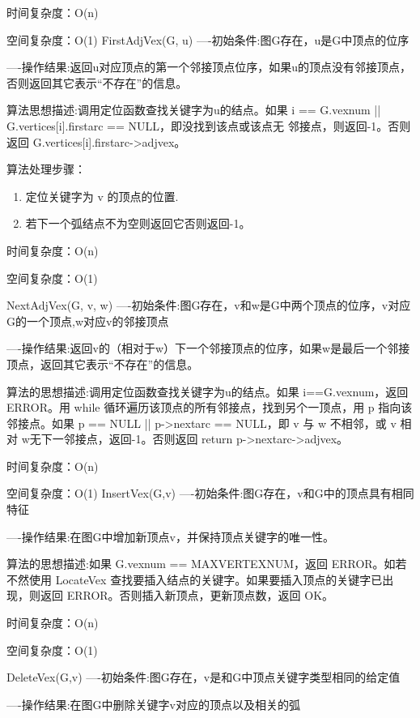 \documentclass[supercite]{Experimental_Report}
\theoremstyle{definition}
\begin{document}
时间复杂度：O(n)

空间复杂度：O(1)
FirstAdjVex(G, u)
----初始条件:图G存在，u是G中顶点的位序

----操作结果:返回u对应顶点的第一个邻接顶点位序，如果u的顶点没有邻接顶点，否则返回其它表示“不存在”的信息。

算法思想描述:调用定位函数查找关键字为u的结点。如果 i == G.vexnum || G.vertices[i].firstarc == NULL，即没找到该点或该点无
邻接点，则返回-1。否则返回 G.vertices[i].firstarc->adjvex。

算法处理步骤：
\begin{enumerate}
	\renewcommand{\labelenumi}{\theenumi)}
	\item 定位关键字为 v 的顶点的位置.
	\item 若下一个弧结点不为空则返回它否则返回-1。
\end{enumerate}

时间复杂度：O(n)

空间复杂度：O(1)

NextAdjVex(G, v, w)
----初始条件:图G存在，v和w是G中两个顶点的位序，v对应G的一个顶点,w对应v的邻接顶点

----操作结果:返回v的（相对于w）下一个邻接顶点的位序，如果w是最后一个邻接顶点，返回其它表示“不存在”的信息。

算法的思想描述:调用定位函数查找关键字为u的结点。如果 i==G.vexnum，返回ERROR。用 while 循环遍历该顶点的所有邻接点，找到另个一顶点，用 p 指向该邻接点。如果 p == NULL || p->nextarc == NULL，即 v 与 w 不相邻，或 v 相对 w无下一邻接点，返回-1。否则返回 return p->nextarc->adjvex。

时间复杂度：O(n)

空间复杂度：O(1)
InsertVex(G,v)
----初始条件:图G存在，v和G中的顶点具有相同特征

----操作结果:在图G中增加新顶点v，并保持顶点关键字的唯一性。

算法的思想描述:如果 G.vexnum == MAXVERTEXNUM，返回 ERROR。如若不然使用 LocateVex 查找要插入结点的关键字。如果要插入顶点的关键字已出现，则返回 ERROR。否则插入新顶点，更新顶点数，返回 OK。

时间复杂度：O(n)

空间复杂度：O(1)


DeleteVex(G,v)
----初始条件:图G存在，v是和G中顶点关键字类型相同的给定值

----操作结果:在图G中删除关键字v对应的顶点以及相关的弧
\end{document}
